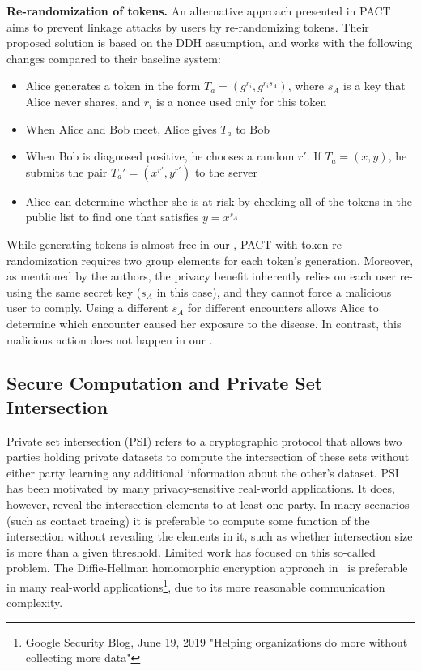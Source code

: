 {	\textbf{Re-randomization of tokens.} An alternative approach presented in PACT~\cite{chan2020pact} aims to prevent linkage attacks by users by re-randomizing tokens. Their proposed solution is based on the DDH assumption, and works with the following changes compared to their baseline system:
	\begin{itemize} 
		\item Alice generates a token in the form $T_a = (g^{r_i}, g^{r_i s_A})$, where $s_A$ is a key that Alice never shares, and $r_i$ is a nonce used only for this token
		\item When Alice and Bob meet, Alice gives $T_a$ to Bob
		\item When Bob is diagnosed positive, he chooses a random $r'$. If $T_a = (x, y)$, he submits the pair $T_a' = (x^{r'}, y^{r'})$ to the server
		\item Alice can determine whether she is at risk by checking all of the tokens in the public list to find one that satisfies $y=x^{s_A}$
	\end{itemize}
	
	While generating tokens is almost free in our \dect, PACT with token re-randomization requires two group elements for each token's generation. Moreover, as mentioned by the authors, the privacy benefit inherently relies on each user re-using the same secret key ($s_A$ in this case), and they cannot force a malicious user to comply. Using a different $s_A$ for different encounters allows Alice to determine which encounter caused her exposure to the disease. In contrast, this malicious action does not happen in our \dect.
	
}
\subsection{Secure Computation and Private Set Intersection}

Private set intersection (PSI) refers to a cryptographic protocol that allows two parties holding private datasets to compute the intersection of these sets without either party learning any additional information about the other's dataset. PSI has been motivated by many privacy-sensitive real-world applications. It does, however, reveal the intersection elements to at least one party. In many scenarios (such as contact tracing) it is preferable to compute some function of the intersection without revealing the elements in it, such as whether intersection size is more than a given threshold. Limited work has focused on this so-called \fpsi problem.  The Diffie-Hellman homomorphic encryption approach in~\cite{EPRINT:IKNPRSSSY19} is preferable in many real-world \fpsi applications\footnote{Google Security Blog, June 19, 2019 "Helping organizations do more without collecting more data"}, due to its more reasonable communication complexity.


